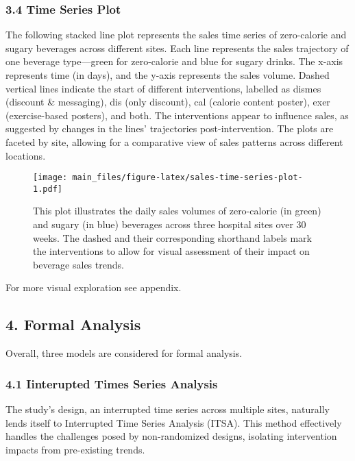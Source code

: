 \documentclass[
]{article}
\begin{document}
\hypertarget{time-series-plot}{%
\subsubsection{3.4 Time Series Plot}\label{time-series-plot}}

The following stacked line plot represents the sales time series of
zero-calorie and sugary beverages across different sites. Each line
represents the sales trajectory of one beverage type---green for
zero-calorie and blue for sugary drinks. The x-axis represents time (in
days), and the y-axis represents the sales volume. Dashed vertical lines
indicate the start of different interventions, labelled as dismes
(discount \& messaging), dis (only discount), cal (calorie content
poster), exer (exercise-based posters), and both. The interventions
appear to influence sales, as suggested by changes in the lines'
trajectories post-intervention. The plots are faceted by site, allowing
for a comparative view of sales patterns across different locations.

\begin{figure}
\centering
\texttt{[image: main\_files/figure-latex/sales-time-series-plot-1.pdf]}
\caption{This plot illustrates the daily sales volumes of zero-calorie
(in green) and sugary (in blue) beverages across three hospital sites
over 30 weeks. The dashed and their corresponding shorthand labels mark
the interventions to allow for visual assessment of their impact on
beverage sales trends.}
\end{figure}

For more visual exploration see appendix.

\hypertarget{formal-analysis}{%
\subsection{4. Formal Analysis}\label{formal-analysis}}

Overall, three models are considered for formal analysis.

\hypertarget{iinterupted-times-series-analysis}{%
\subsubsection{4.1 Iinterupted Times Series
Analysis}\label{iinterupted-times-series-analysis}}

The study's design, an interrupted time series across multiple sites,
naturally lends itself to Interrupted Time Series Analysis (ITSA). This
method effectively handles the challenges posed by non-randomized
designs, isolating intervention impacts from pre-existing trends.
\end{document}
